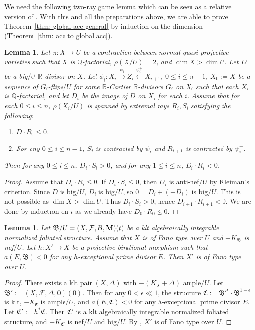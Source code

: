 \documentclass[11pt,reqno]{amsart}
\numberwithin{equation}{section}
\newcommand{\Mm}{{\bf{M}}}
\newcommand{\Cc}{\mathfrak{C}}
\newcommand{\Bb}{{\mathfrak{B}}}
\newcommand{\Ff}{\mathcal{F}}
\newtheorem{lem}[thm]{Lemma}
\theoremstyle{definition}
\begin{document}
We need the following two-ray game lemma which can be seen as a relative version of \cite[Lemma~9.1]{MP04}. With this and all the preparations above, we are able to prove Theorem~\ref{thm: global acc general} by induction on the dimension (Theorem~\ref{thm: acc to global acc}).

\begin{lem}\label{lem: relative two-ray}
    Let $\pi: X\rightarrow U$ be a contraction between normal quasi-projective varieties such that $X$ is $\mathbb Q$-factorial, $\rho(X/U)=2$, and $\dim X>\dim U$. Let $D$ be a big$/U$ $\mathbb R$-divisor on $X$. Let $\phi_i: X_i\xrightarrow{\psi_i} Z_i\xleftarrow{\psi_i^+} X_{i+1}$, $0\leq i\leq n-1$, $X_0:=X$ be a sequence of $G_i$-flips$/U$ for some $\mathbb R$-Cartier $\mathbb R$-divisors $G_i$ on $X_i$ 
    such that each $X_i$ is $\mathbb Q$-factorial, and let $D_i$ be the image of $D$ on $X_i$ for each $i$. Assume that for each $0\leq i\leq n$, $\rho(X_i/U)$ is spanned by extremal rays $R_i,S_i$ satisfying the following:
    \begin{enumerate}
        \item $D\cdot R_0\leq 0$.
        \item For any $0\leq i\leq n-1$, $S_i$ is contracted by $\psi_i$ and $R_{i+1}$ is contracted by $\psi_i^+$.
    \end{enumerate}
    Then for any $0\leq i\leq n$, $D_i\cdot S_i>0$, and for any $1\leq i\leq n$, $D_i\cdot R_i<0$.
\end{lem}
\begin{proof}
Assume that $D_i\cdot R_i\leq 0$. If $D_i\cdot S_i\leq 0$, then $D_i$ is anti-nef$/U$ by Kleiman's criterion. Since $D$ is big$/U$, $D_i$ is big$/U$, so $0=D_i+(-D_i)$ is big$/U$. This is not possible as $\dim X>\dim U$. Thus $D_i\cdot S_i>0$, hence $D_{i+1}\cdot R_{i+1}<0$. We are done by induction on $i$ as we already have $D_0\cdot R_0\leq 0$.
\end{proof}

\begin{lem}\label{lem: fano type after extract divisor}
    Let $\Bb/U=(X,\Ff,B,\Mm)(t)$ be a klt algebraically integrable normalized foliated structure. Assume that $X$ is of Fano type over $U$ and $-K_{\Bb}$ is nef$/U$. Let $h\colon X'\rightarrow X$ be a projective birational morphism such that $a(E,\Bb)<0$ for any $h$-exceptional prime divisor $E$. Then $X'$ is of Fano type over $U$.
\end{lem}
\begin{proof}
    There exists a klt pair $(X,\Delta)$ with $-(K_X+\Delta)$ ample$/U$. Let $\Bb':=(X,\Ff,\Delta,\bm{0})(0)$. Then for any $0<\epsilon\ll 1$, the structure $\Cc:=\Bb'^{\epsilon}\cdot\Bb^{1-\epsilon}$ is klt, $-K_{\Cc}$ is ample$/U$, and $a(E,\Cc)<0$ for any $h$-exceptional prime divisor $E$. Let $\Cc':=h^*\Cc$. Then $\Cc'$ is a klt algebraically integrable normalized foliated structure, and $-K_{\Cc'}$ is nef$/U$ and big$/U$. By \cite[Theorem~9.2]{Cas+25a}, $X'$ is of Fano type over $U$.
\end{proof}
\end{document}
